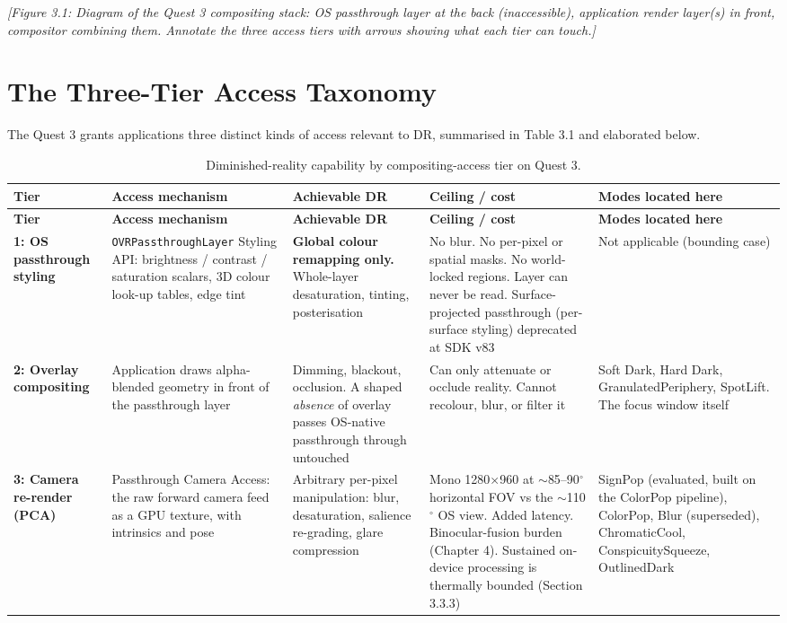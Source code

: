 \textit{[Figure 3.1: Diagram of the Quest 3 compositing stack: OS passthrough layer at the back
(inaccessible), application render layer(s) in front, compositor combining them. Annotate the three
access tiers with arrows showing what each tier can touch.]}

\section{The Three-Tier Access Taxonomy}

The Quest 3 grants applications three distinct kinds of access relevant to DR, summarised in
Table 3.1 and elaborated below.

\begin{longtable}{p{}p{}p{}p{}p{}}
\caption{Diminished-reality capability by compositing-access tier on Quest 3.} \\
\hline
\textbf{Tier} & \textbf{Access mechanism} & \textbf{Achievable DR} & \textbf{Ceiling / cost} & \textbf{Modes located here} \\
\hline
\endfirsthead
\hline
\textbf{Tier} & \textbf{Access mechanism} & \textbf{Achievable DR} & \textbf{Ceiling / cost} & \textbf{Modes located here} \\
\hline
\endhead
\textbf{1: OS passthrough styling} &
\verb|OVRPassthroughLayer| Styling API: brightness / contrast / saturation scalars, 3D colour look-up tables, edge tint &
\textbf{Global colour remapping only.} Whole-layer desaturation, tinting, posterisation &
No blur. No per-pixel or spatial masks. No world-locked regions. Layer can never be read. Surface-projected passthrough (per-surface styling) deprecated at SDK v83 &
Not applicable (bounding case) \\
\hline
\textbf{2: Overlay compositing} &
Application draws alpha-blended geometry in front of the passthrough layer &
Dimming, blackout, occlusion. A shaped \textit{absence} of overlay passes OS-native passthrough through untouched &
Can only attenuate or occlude reality. Cannot recolour, blur, or filter it &
Soft Dark, Hard Dark, GranulatedPeriphery, SpotLift. The focus window itself \\
\hline
\textbf{3: Camera re-render (PCA)} &
Passthrough Camera Access: the raw forward camera feed as a GPU texture, with intrinsics and pose &
Arbitrary per-pixel manipulation: blur, desaturation, salience re-grading, glare compression &
Mono 1280$\times$960 at $\sim$85–90$^{\circ}$ horizontal FOV vs the $\sim$110$^{\circ}$ OS view. Added latency. Binocular-fusion burden (Chapter 4). Sustained on-device processing is thermally bounded (Section 3.3.3) &
SignPop (evaluated, built on the ColorPop pipeline), ColorPop, Blur (superseded), ChromaticCool, ConspicuitySqueeze, OutlinedDark \\
\hline
\end{longtable}

